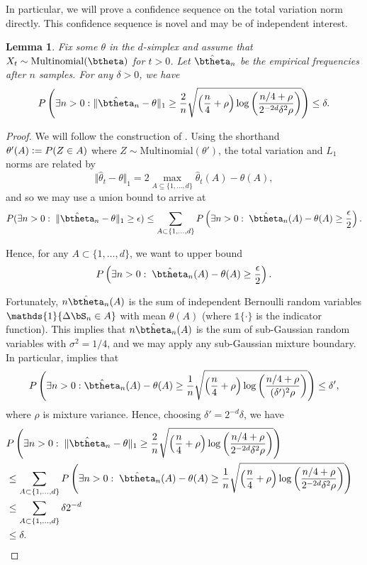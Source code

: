 \documentclass[11pt]{article}
\def\log{{\rm log}}
\newtheorem{lemma}{Lemma}[section]
\newcommand{\df}{\vcentcolon=}
\newcommand{\pfrac}[2]{\left(\frac{#1}{#2}\right)}
\begin{document}
In particular, we will prove a confidence sequence on the total variation norm directly.
This confidence sequence is novel and may be of independent interest.
\begin{lemma}\label{lem:CS}
  Fix some $\theta$ in the $d$-simplex and assume that $X_t\sim\mathrm{Multinomial}(\btheta)$ for $t>0$.
Let $\hat\btheta_n$ be the empirical frequencies after $n$ samples.
For any $\delta>0$,  we have
\begin{equation}\label{eqn:multinomial.CS}
  P\left( \exists n > 0: \Vert \hat\btheta_n - \theta\Vert_1
    \geq
  \frac{2}{n}\sqrt{\left(\frac{n}{4} + \rho\right)\log\pfrac{n/4+\rho}{2^{-2d}\delta^2 \rho}} 
  \right)
  \leq \delta.
\end{equation}  
\end{lemma}
\begin{proof}
  We will follow the construction of \cite{weissman2003inequalities}.
  Using the shorthand $\theta'(A) \df P(Z\in  A)$ where $Z\sim\mathrm{Multinomial}(\theta')$, the total variation and $L_1$ norms are related by
\[
  \Vert \hat\theta_t - \theta\Vert_1
  =
  2 \max_{A \subseteq \{1,\ldots, d\}} \hat\theta_t(A) - \theta(A),
\]
and so we may use a union bound to arrive at
\begin{align*}
  P(\exists n > 0:\; \Vert \hat\btheta_n - \theta\Vert_1 \geq \epsilon)
  \leq
  \sum_{A \subset \{1,\ldots, d\}}
  P\left(\exists n > 0:\; \hat\btheta_n(A) - \theta(A) \geq \frac{\epsilon}{2}\right).
\end{align*}

Hence, for any $A \subset \{1,\ldots, d\}$, we want to upper bound
\[
 P\left(\exists n > 0:\; \hat\btheta_n(A) - \theta(A) \geq \frac{\epsilon}{2}\right).
\]

Fortunately, $n \hat\btheta_n(A)$ is the sum of independent Bernoulli random variables $\mathds{1}\{ \Delta \bS_n \in A\}$ with mean $\theta(A)$ (where $\mathds{1}\{\cdot\}$ is the indicator function).
This implies that $n \hat\btheta_n(A)$ is the sum of sub-Gaussian random variables with $\sigma^2 = 1/4$, and we may apply any sub-Gaussian mixture boundary.
In particular, \cite[Equation~14]{howard2018uniform} implies that
\[
  P\left(\exists n > 0: \hat\btheta_n(A) - \theta(A) \geq
    \frac{1}{n}\sqrt{\left(\frac{n}{4} + \rho\right)\log\pfrac{n/4+\rho}{(\delta')^2 \rho}}
  \right)
  \leq
  \delta',
\]
where $\rho$ is mixture variance.
Hence, choosing $\delta' = 2^{-d} \delta$, we have
\begin{align*}
  \lefteqn{
  P\left(\exists n > 0:\; \Vert \hat\btheta_n - \theta\Vert_1 \geq
  \frac{2}{n}\sqrt{\left(\frac{n}{4} + \rho\right)\log\pfrac{n/4+\rho}{2^{-2d}\delta^2 \rho}} 
\right)
  }\\
  &\leq
  \sum_{A \subset \{1,\ldots, d\}}
  P\left(\exists n > 0:\; \hat\btheta_n(A) - \theta(A)
  \geq
    \frac{1}{n}\sqrt{\left(\frac{n}{4} + \rho\right)\log\pfrac{n/4+\rho}{2^{-2d}\delta^2 \rho}}  
  \right)\\
  &\leq
    \sum_{A \subset \{1,\ldots, d\}}
    \delta 2^{-d}\\
  &\leq
  \delta.
\end{align*}



\end{proof}
\end{document}
